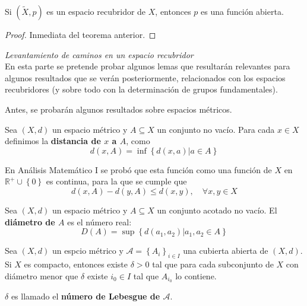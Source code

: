 \documentclass{article}
\theoremstyle{largebreak}
\newcommand\subtitle[1]{\textit{\large #1}\\}
\begin{document}
    \begin{cor}
        Si $(\widetilde{X},p)$ es un espacio recubridor de $X$, entonces $p$ es una función abierta.
    \end{cor}

    \begin{proof}
        Inmediata del teorema anterior.
    \end{proof}

    \subtitle{Levantamiento de caminos en un espacio recubridor}

    En esta parte se pretende probar algunos lemas que resultarán relevantes para algunos resultados que se verán posteriormente, relacionados con los espacios recubridores (y sobre todo con la determinación de grupos fundamentales).

    Antes, se probarán algunos resultados sobre espacios métricos.

    \begin{mydef}
        Sea $(X,d)$ un espacio métrico y $A\subseteq X$ un conjunto no vacío. Para cada $x\in X$ definimos la \textbf{distancia de $x$ a $A$}, como
        \begin{equation*}
            d(x,A)=\inf\left\{d(x,a)\Big|a\in A \right\}
        \end{equation*}
    \end{mydef}

    En Análisis Matemático I se probó que esta función como una función de $X$ en $\mathbb{R}^+\cup\left\{0\right\}$ es continua, para la que se cumple que
    \begin{equation*}
        d(x,A)-d(y,A)\leq d(x,y),\quad\forall x,y\in X
    \end{equation*}

    \begin{mydef}
        Sea $(X,d)$ un espacio métrico y $A\subseteq X$ un conjunto acotado no vacío. El \textbf{diámetro de $A$} es el número real:
        \begin{equation*}
            D(A)=\sup\left\{d(a_1,a_2)\Big|a_1,a_2\in A \right\}
        \end{equation*}
    \end{mydef}

    \begin{lema}
        Sea $(X,d)$ un espcio métrico y $\mathcal{A}=\left\{A_i \right\}_{ i\in I}$ una cubierta abierta de $(X,d)$. Si $X$ es compacto, entonces existe $\delta>0$ tal que para cada subconjunto de $X$ con diámetro menor que $\delta$ existe $i_0\in I$ tal que $A_{ i_0}$ lo contiene. 

        $\delta$ es llamado el \textbf{número de Lebesgue de $\mathcal{A}$}.
    \end{lema}
\end{document}
